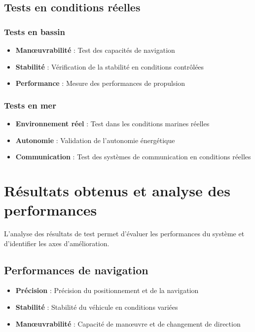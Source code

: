 {\subsection{Tests en conditions réelles}
\subsubsection{Tests en bassin}
\begin{itemize}
    \item \textbf{Manœuvrabilité} : Test des capacités de navigation
    \item \textbf{Stabilité} : Vérification de la stabilité en conditions contrôlées
    \item \textbf{Performance} : Mesure des performances de propulsion
\end{itemize}

\subsubsection{Tests en mer}
\begin{itemize}
    \item \textbf{Environnement réel} : Test dans les conditions marines réelles
    \item \textbf{Autonomie} : Validation de l'autonomie énergétique
    \item \textbf{Communication} : Test des systèmes de communication en conditions réelles
\end{itemize}

\section{Résultats obtenus et analyse des performances}
L'analyse des résultats de test permet d'évaluer les performances du système et d'identifier les axes d'amélioration.

\subsection{Performances de navigation}
\begin{itemize}
    \item \textbf{Précision} : Précision du positionnement et de la navigation
    \item \textbf{Stabilité} : Stabilité du véhicule en conditions variées
    \item \textbf{Manœuvrabilité} : Capacité de manœuvre et de changement de direction
\end{itemize}

}
